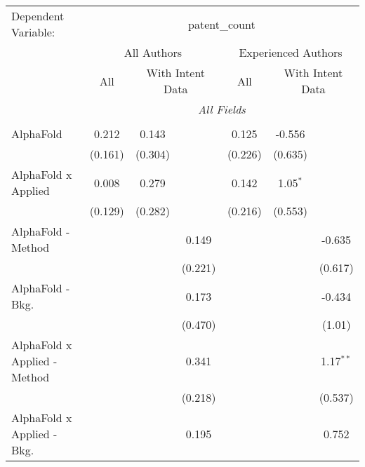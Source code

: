 \begingroup
\centering
\begin{tabular}{lcccccc}
   \tabularnewline \midrule \midrule
   Dependent Variable: & \multicolumn{6}{c}{patent\_count}\\
 & \multicolumn{3}{c}{All Authors} & \multicolumn{3}{c}{Experienced Authors} \\
\cmidrule(lr){2-4} \cmidrule(lr){5-7}
 & \multicolumn{1}{c}{All} & \multicolumn{2}{c}{With Intent Data} & \multicolumn{1}{c}{All} & \multicolumn{2}{c}{With Intent Data} \\
\cmidrule(lr){2-2} \cmidrule(lr){3-4} \cmidrule(lr){5-5} \cmidrule(lr){6-7}
 & \multicolumn{6}{c}{\textit{All Fields}} \\ \\
   AlphaFold                      & 0.212          & 0.143         &               & 0.125          & -0.556        &   \\   
                                  & (0.161)        & (0.304)       &               & (0.226)        & (0.635)       &   \\   
   AlphaFold x Applied            & 0.008          & 0.279         &               & 0.142          & 1.05$^{*}$    &   \\   
                                  & (0.129)        & (0.282)       &               & (0.216)        & (0.553)       &   \\   
   AlphaFold - Method             &                &               & 0.149         &                &               & -0.635\\   
                                  &                &               & (0.221)       &                &               & (0.617)\\   
   AlphaFold - Bkg.               &                &               & 0.173         &                &               & -0.434\\   
                                  &                &               & (0.470)       &                &               & (1.01)\\   
   AlphaFold x Applied - Method   &                &               & 0.341         &                &               & 1.17$^{**}$\\   
                                  &                &               & (0.218)       &                &               & (0.537)\\   
   AlphaFold x Applied - Bkg.     &                &               & 0.195         &                &               & 0.752\\   

\end{tabular}
